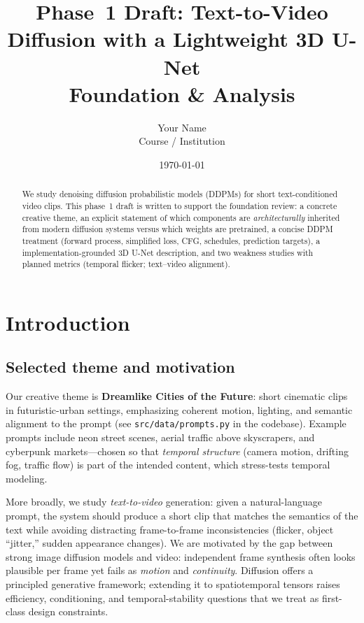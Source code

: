 \documentclass[11pt,a4paper]{article}
\title{Phase~1 Draft: Text-to-Video Diffusion with a Lightweight 3D U-Net\\
\large Foundation \& Analysis}
\author{Your Name \\ Course / Institution}
\date{\today}
\begin{document}
\maketitle

\begin{abstract}
We study denoising diffusion probabilistic models (DDPMs) for short text-conditioned video clips.
This phase~1 draft is written to support the foundation review: a concrete creative theme, an explicit statement of which components are \emph{architecturally} inherited from modern diffusion systems versus which weights are pretrained, a concise DDPM treatment (forward process, simplified loss, CFG, schedules, prediction targets), a implementation-grounded 3D U-Net description, and two weakness studies with planned metrics (temporal flicker; text--video alignment).
\end{abstract}

\section{Introduction}
\label{sec:intro}

\subsection{Selected theme and motivation}
Our creative theme is \textbf{Dreamlike Cities of the Future}: short cinematic clips in futuristic-urban settings, emphasizing coherent motion, lighting, and semantic alignment to the prompt (see \texttt{src/data/prompts.py} in the codebase).
Example prompts include neon street scenes, aerial traffic above skyscrapers, and cyberpunk markets---chosen so that \emph{temporal structure} (camera motion, drifting fog, traffic flow) is part of the intended content, which stress-tests temporal modeling.

More broadly, we study \emph{text-to-video} generation: given a natural-language prompt, the system should produce a short clip that matches the semantics of the text while avoiding distracting frame-to-frame inconsistencies (flicker, object ``jitter,'' sudden appearance changes).
We are motivated by the gap between strong image diffusion models and video: independent frame synthesis often looks plausible per frame yet fails as \emph{motion} and \emph{continuity}.
Diffusion offers a principled generative framework; extending it to spatiotemporal tensors raises efficiency, conditioning, and temporal-stability questions that we treat as first-class design constraints.
\end{document}
